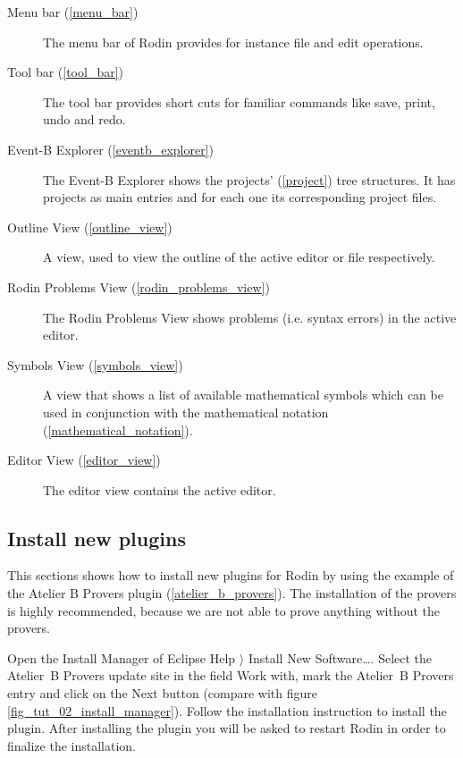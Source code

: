 \begin{description}
	\item[Menu bar (\ref{menu_bar})] The menu bar of Rodin provides for instance file and edit operations.
	\item[Tool bar (\ref{tool_bar})] The tool bar provides short cuts for familiar commands like save, print, undo and redo.
	\item[Event-B Explorer (\ref{eventb_explorer})] The Event-B Explorer shows the projects' (\ref{project}) tree structures. It has projects as main entries and for each one its corresponding project files.
	\item[Outline View (\ref{outline_view})] A view, used to view the outline of the active editor or file respectively.
	\item[Rodin Problems View (\ref{rodin_problems_view})] The Rodin Problems View shows problems (i.e. syntax errors) in the active editor.
	\item[Symbols View (\ref{symbols_view})] A view that shows a list of available mathematical symbols which can be used in conjunction with the mathematical notation (\ref{mathematical_notation}).
	\item[Editor View (\ref{editor_view})] The editor view contains the active editor.
\end{description}

\subsection{Install new plugins}

This sections shows how to install new plugins for Rodin by using the example of the Atelier B Provers plugin (\ref{atelier_b_provers}). The installation of the provers is highly recommended, because we are not able to prove anything without the provers.

Open the Install Manager of Eclipse \textsf{Help $\rangle$ Install New Software\ldots}. Select the Atelier~B Provers update site in the field \textsf{Work with}, mark the Atelier~B Provers entry and click on the \textsf{Next} button (compare with figure \ref{fig_tut_02_install_manager}). Follow the installation instruction to install the plugin. After installing the plugin you will be asked to restart Rodin in order to finalize the installation.


